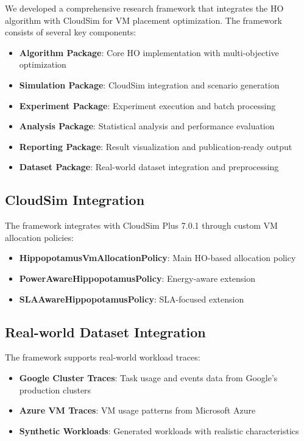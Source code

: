 \documentclass[conference]{IEEEtran}
\begin{document}
We developed a comprehensive research framework that integrates the HO algorithm with CloudSim for VM placement optimization. The framework consists of several key components:

\begin{itemize}
    \item \textbf{Algorithm Package}: Core HO implementation with multi-objective optimization
    \item \textbf{Simulation Package}: CloudSim integration and scenario generation
    \item \textbf{Experiment Package}: Experiment execution and batch processing
    \item \textbf{Analysis Package}: Statistical analysis and performance evaluation
    \item \textbf{Reporting Package}: Result visualization and publication-ready output
    \item \textbf{Dataset Package}: Real-world dataset integration and preprocessing
\end{itemize}

\subsection{CloudSim Integration}

The framework integrates with CloudSim Plus 7.0.1 through custom VM allocation policies:

\begin{itemize}
    \item \textbf{HippopotamusVmAllocationPolicy}: Main HO-based allocation policy
    \item \textbf{PowerAwareHippopotamusPolicy}: Energy-aware extension
    \item \textbf{SLAAwareHippopotamusPolicy}: SLA-focused extension
\end{itemize}

\subsection{Real-world Dataset Integration}

The framework supports real-world workload traces:

\begin{itemize}
    \item \textbf{Google Cluster Traces}: Task usage and events data from Google's production clusters
    \item \textbf{Azure VM Traces}: VM usage patterns from Microsoft Azure
    \item \textbf{Synthetic Workloads}: Generated workloads with realistic characteristics
\end{itemize}
\end{document}
